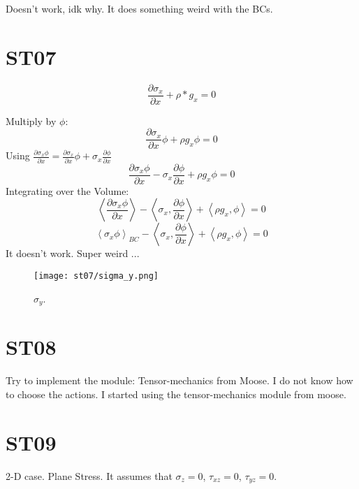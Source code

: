 \documentclass[11pt,letterpaper]{article}
\begin{document}
Doesn't work, idk why. It does something weird with the BCs.

\section{ST07}

\begin{equation}
\frac{\partial \sigma_x}{\partial x} + \rho * g_x = 0
\end{equation}

Multiply by $\phi$:
\begin{equation}
\frac{\partial \sigma_x}{\partial x} \phi + \rho g_x \phi = 0
\end{equation}
Using $\frac{\partial \sigma_x \phi}{\partial x}=\frac{\partial \sigma_x}{\partial x} \phi + \sigma_x \frac{\partial \phi}{\partial x}$
\begin{equation}
\frac{\partial \sigma_x \phi}{\partial x} - \sigma_x \frac{\partial \phi}{\partial x} + \rho g_x \phi = 0
\end{equation}
Integrating over the Volume:
\begin{equation}
\left< \frac{\partial \sigma_x \phi}{\partial x} \right> - \left< \sigma_x,\frac{\partial \phi}{\partial x} \right> + \left< \rho g_x,\phi \right> = 0
\end{equation}
\begin{equation}
\left< \sigma_x \phi \right>_{BC} - \left< \sigma_x,\frac{\partial \phi}{\partial x} \right> + \left< \rho g_x,\phi \right> = 0
\end{equation}
It doesn't work. Super weird ...

\begin{figure}[H]
	\centering
	\texttt{[image: st07/sigma\_y.png]}
	\hfill
	\caption{$\sigma_y$.}
	\label{fig:st07}
\end{figure}

\section{ST08}

Try to implement the module: Tensor-mechanics from Moose.
I do not know how to choose the actions. I started using the tensor-mechanics module from moose.

\section{ST09}

2-D case. Plane Stress. It assumes that $\sigma_z = 0$, $\tau_{xz} = 0$, $\tau_{yz} = 0$.
\end{document}
